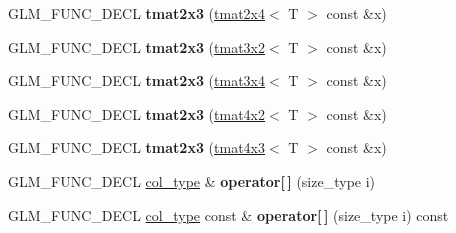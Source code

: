 \begin{DoxyCompactItemize}
\item 
\hypertarget{structglm_1_1detail_1_1tmat2x3_ac67a0bfa428c9adbc3c7a1b32ae0f292}{}G\+L\+M\+\_\+\+F\+U\+N\+C\+\_\+\+D\+E\+C\+L {\bfseries tmat2x3} (\hyperlink{structglm_1_1detail_1_1tmat2x4}{tmat2x4}$<$ T $>$ const \&x)\label{structglm_1_1detail_1_1tmat2x3_ac67a0bfa428c9adbc3c7a1b32ae0f292}

\item 
\hypertarget{structglm_1_1detail_1_1tmat2x3_ac4405d75f2e6cc396ba8a5b857074943}{}G\+L\+M\+\_\+\+F\+U\+N\+C\+\_\+\+D\+E\+C\+L {\bfseries tmat2x3} (\hyperlink{structglm_1_1detail_1_1tmat3x2}{tmat3x2}$<$ T $>$ const \&x)\label{structglm_1_1detail_1_1tmat2x3_ac4405d75f2e6cc396ba8a5b857074943}

\item 
\hypertarget{structglm_1_1detail_1_1tmat2x3_adb82dcc2f875fd2b2d3d6ce05761b0f3}{}G\+L\+M\+\_\+\+F\+U\+N\+C\+\_\+\+D\+E\+C\+L {\bfseries tmat2x3} (\hyperlink{structglm_1_1detail_1_1tmat3x4}{tmat3x4}$<$ T $>$ const \&x)\label{structglm_1_1detail_1_1tmat2x3_adb82dcc2f875fd2b2d3d6ce05761b0f3}

\item 
\hypertarget{structglm_1_1detail_1_1tmat2x3_a189a3e0e88f64eb5dd4b2b836287c1e2}{}G\+L\+M\+\_\+\+F\+U\+N\+C\+\_\+\+D\+E\+C\+L {\bfseries tmat2x3} (\hyperlink{structglm_1_1detail_1_1tmat4x2}{tmat4x2}$<$ T $>$ const \&x)\label{structglm_1_1detail_1_1tmat2x3_a189a3e0e88f64eb5dd4b2b836287c1e2}

\item 
\hypertarget{structglm_1_1detail_1_1tmat2x3_a63060936bb93757759d586cf6e1750cf}{}G\+L\+M\+\_\+\+F\+U\+N\+C\+\_\+\+D\+E\+C\+L {\bfseries tmat2x3} (\hyperlink{structglm_1_1detail_1_1tmat4x3}{tmat4x3}$<$ T $>$ const \&x)\label{structglm_1_1detail_1_1tmat2x3_a63060936bb93757759d586cf6e1750cf}

\item 
\hypertarget{structglm_1_1detail_1_1tmat2x3_a7fa88813ee0581af8aed78ca20e7a0a1}{}G\+L\+M\+\_\+\+F\+U\+N\+C\+\_\+\+D\+E\+C\+L \hyperlink{structglm_1_1detail_1_1tvec3}{col\+\_\+type} \& {\bfseries operator\mbox{[}$\,$\mbox{]}} (size\+\_\+type i)\label{structglm_1_1detail_1_1tmat2x3_a7fa88813ee0581af8aed78ca20e7a0a1}

\item 
\hypertarget{structglm_1_1detail_1_1tmat2x3_a1008ba45200ec07a341cda897e150d78}{}G\+L\+M\+\_\+\+F\+U\+N\+C\+\_\+\+D\+E\+C\+L \hyperlink{structglm_1_1detail_1_1tvec3}{col\+\_\+type} const \& {\bfseries operator\mbox{[}$\,$\mbox{]}} (size\+\_\+type i) const \label{structglm_1_1detail_1_1tmat2x3_a1008ba45200ec07a341cda897e150d78}


\end{DoxyCompactItemize}
